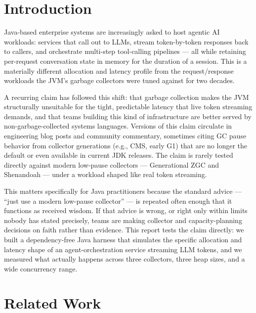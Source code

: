 \documentclass[11pt]{article}
\begin{document}
\section{Introduction}

Java-based enterprise systems are increasingly asked to host agentic AI workloads: services that
call out to LLMs, stream token-by-token responses back to callers, and orchestrate multi-step
tool-calling pipelines --- all while retaining per-request conversation state in memory for the
duration of a session. This is a materially different allocation and latency profile from the
request/response workloads the JVM's garbage collectors were tuned against for two decades.

A recurring claim has followed this shift: that garbage collection makes the JVM structurally
unsuitable for the tight, predictable latency that live token streaming demands, and that teams
building this kind of infrastructure are better served by non-garbage-collected systems
languages. Versions of this claim circulate in engineering blog posts and community commentary,
sometimes citing GC pause behavior from collector generations (e.g., CMS, early G1) that are no
longer the default or even available in current JDK releases. The claim is rarely tested directly
against modern low-pause collectors --- Generational ZGC and Shenandoah --- under a workload
shaped like real token streaming.

This matters specifically for Java practitioners because the standard advice --- ``just use a
modern low-pause collector'' --- is repeated often enough that it functions as received wisdom.
If that advice is wrong, or right only within limits nobody has stated precisely, teams are
making collector and capacity-planning decisions on faith rather than evidence. This report tests
the claim directly: we built a dependency-free Java harness that simulates the specific
allocation and latency shape of an agent-orchestration service streaming LLM tokens, and we
measured what actually happens across three collectors, three heap sizes, and a wide concurrency
range.

\section{Related Work}
\end{document}
